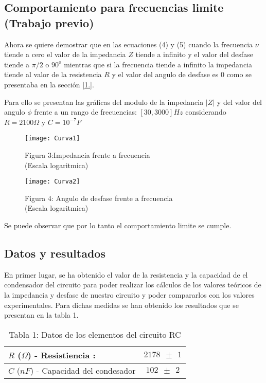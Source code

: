 \documentclass[article, 11pt]{report}
\begin{document}
	\subsection{Comportamiento para frecuencias limite (Trabajo previo)}
	Ahora se quiere demostrar que en las ecuaciones (4) y (5) cuando la frecuencia $\nu$ tiende a cero el valor de la impedancia $Z$ tiende a infinito y el valor del desfase tiende a $\pi/2$ o $90^o$ mientras que si la frecuencia tiende a infinito la impedancia tiende al valor de la resistencia $R$ y el valor del angulo de desfase es 0 como se presentaba en la sección \ref{1.}.
	
	Para ello se presentan las gráficas del modulo de la impedancia $|Z|$ y del valor del angulo $\phi$ frente a un rango de frecuencias: $[30,3000]Hz$ considerando $R=2100\Omega$ y $C= 10^{-7} F$	
	
	
	
	
	
	
	\begin{figure}[H]
		\centering
		\begin{minipage}{.5\textwidth}
			\centering
			\texttt{[image: Curva1]}
			\caption*{Figura 3:Impedancia frente a frecuencia
			\\ (Escala logaritmica)}
		\end{minipage}%
		\begin{minipage}{.5\textwidth}
			\centering
			\texttt{[image: Curva2]}
			\caption*{Figura 4: Angulo de desfase frente a frecuencia\\ (Escala logaritmica)}
			
		\end{minipage}
	\end{figure}

Se puede observar que por lo tanto el comportamiento limite se cumple.


\subsection{Datos y resultados}
	
	En primer lugar, se ha obtenido el valor de la resistencia y la capacidad de el condensador del circuito para poder realizar los cálculos de los valores teóricos de la impedancia y desfase de nuestro circuito y poder compararlos con los valores experimentales. Para dichas medidas se han obtenido los resultados que se presentan en la tabla 1.
	
			\begin{table}[H]
		\begin{center}
			\begin{tabular}{ |m{7.5cm}  |   c  | }
				\hline
				$R$ ($\Omega$) - Resistiencia :  &   $2178 ~~ \pm ~~ 1$     \\ \hline
				$ C$ ($nF$) -	Capacidad del condesador &  $102 ~~ \pm ~~ 2$   \\  \hline
			\end{tabular}
			\label{Tab:1}
			\caption*{Tabla 1: Datos de los elementos del circuito RC }
		\end{center}
	\end{table}
	
\end{document}
